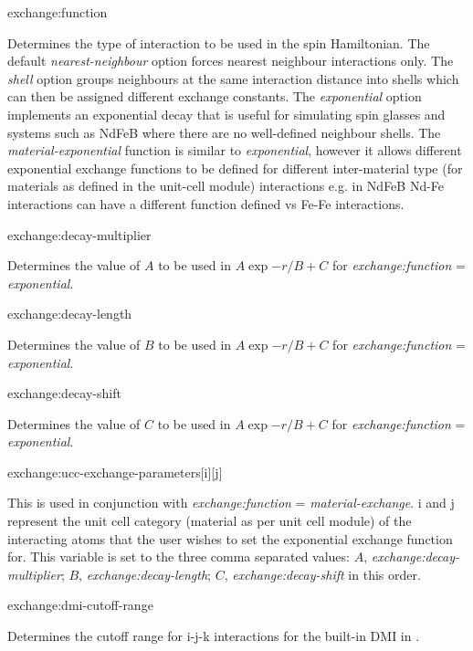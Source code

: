 {\zicf exchange:function} Determines the type of interaction to be used in the spin Hamiltonian. The default \textit{nearest-neighbour} option forces nearest neighbour interactions only. The \textit{shell} option groups neighbours at the same interaction distance into shells which can then be assigned different exchange constants. The \textit{exponential} option implements an exponential decay that is useful for simulating spin glasses and systems such as NdFeB where there are no well-defined neighbour shells. The \textit{material-exponential} function is similar to \textit{exponential}, however it allows different exponential exchange functions to be defined for different inter-material type (for materials as defined in the unit-cell module) interactions e.g. in NdFeB Nd-Fe interactions can have a different function defined vs Fe-Fe interactions.

{\zicf exchange:decay-multiplier} Determines the value of $A$ to be used in $A\exp{-r/B}+C$ for \textit{exchange:function} = \textit{exponential}.

{\zicf exchange:decay-length} Determines the value of $B$ to be used in $A\exp{-r/B}+C$ for \textit{exchange:function} = \textit{exponential}.

{\zicf exchange:decay-shift} Determines the value of $C$ to be used in $A\exp{-r/B}+C$ for \textit{exchange:function} = \textit{exponential}.

{\zicf exchange:ucc-exchange-parameters[i][j]} This is used in conjunction with \textit{exchange:function} = \textit{material-exchange}. i and j represent the unit cell category (material as per unit cell module) of the interacting atoms that the user wishes to set the exponential exchange function for. This variable is set to the three comma separated values: $A$, \textit{exchange:decay-multiplier}; $B$, \textit{exchange:decay-length}; $C$, \textit{exchange:decay-shift} in this order.

{\zicf exchange:dmi-cutoff-range} Determines the cutoff range for i-j-k interactions for the built-in DMI in \vampire.

